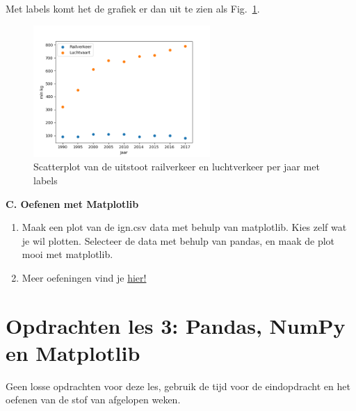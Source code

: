 Met labels komt het de grafiek er dan uit te zien als Fig.~\ref{fig:matplotlib_scatter_2}.

\begin{figure}[h]
\begin{center}
\includegraphics[width=0.6\textwidth]{img/matplotlib_scatter_2.png}
\caption{\label{fig:matplotlib_scatter_2} Scatterplot van de uitstoot railverkeer en luchtverkeer per jaar met labels}
\end{center}
\end{figure}

\textbf{C. Oefenen met Matplotlib}

\begin{enumerate}[label=\textbf{C.\arabic*}]
\item Maak een plot van de ign.csv data met behulp van matplotlib. Kies zelf wat je wil plotten. Selecteer de data met behulp van pandas, en maak de plot mooi met matplotlib. 
\item Meer oefeningen vind je \href{https://www.w3resource.com/graphics/matplotlib/}{hier!}
\end{enumerate}

\section{Opdrachten les 3: Pandas, NumPy en Matplotlib}
Geen losse opdrachten voor deze les, gebruik de tijd voor de eindopdracht en het oefenen van de stof van afgelopen weken. 
